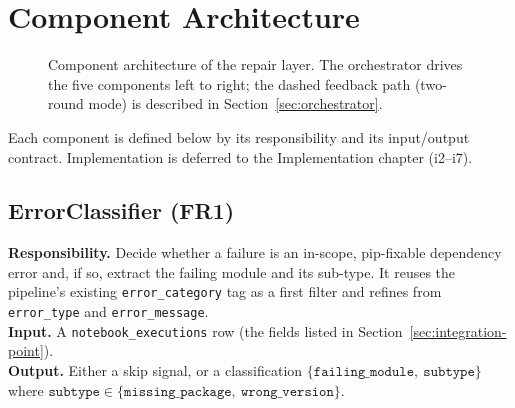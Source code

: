 \section{Component Architecture}
\label{sec:components}

\begin{figure}[t]
  \centering
  \caption{Component architecture of the repair layer. The orchestrator
           drives the five components left to right; the dashed feedback
           path (two-round mode) is described in
           Section~\ref{sec:orchestrator}.}
  \label{fig:architecture-components}
\end{figure}

Each component is defined below by its responsibility and its input/output
contract. Implementation is deferred to the Implementation chapter (i2--i7).

\subsection{ErrorClassifier (FR1)}
\label{subsec:errorclassifier}
\textbf{Responsibility.} Decide whether a failure is an in-scope,
pip-fixable dependency error and, if so, extract the failing module and
its sub-type. It reuses the pipeline's existing \texttt{error\_category}
tag as a first filter and refines from \texttt{error\_type} and
\texttt{error\_message}.\\
\textbf{Input.} A \texttt{notebook\_executions} row (the fields listed in
Section~\ref{sec:integration-point}).\\
\textbf{Output.} Either a skip signal, or a classification
$\{\texttt{failing\_module},\ \texttt{subtype}\}$ where
$\texttt{subtype} \in \{\texttt{missing\_package},\ \texttt{wrong\_version}\}$.

